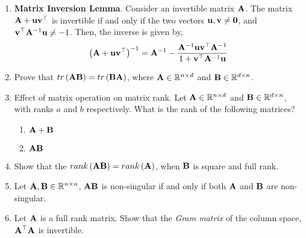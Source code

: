 \documentclass[
11pt, %
a4paper, %
oneside, %
headinclude,footinclude, %
BCOR5mm, %
]{scrartcl}
\def\mf{\ensuremath\mathbf}
\def\mb{\ensuremath\mathbb}
\def\lp{\ensuremath\left(}
\def\rp{\ensuremath\right)}
\begin{document}
\begin{enumerate}
	\item \textbf{Matrix Inversion Lemma}. Consider an invertible matrix $\mf{A}$. The matrix $\mf{A} + \mf{u}\mf{v}^\top$ is invertible if and only if the two vectors $\mf{u}, \mf{v} \neq \mf{0}$, and $\mf{v}^\top\mf{A}^{-1}\mf{u} \neq -1$. Then, the inverse is given by,
	\[ \lp \mf{A} + \mf{u}\mf{v}^\top\rp^{-1} = \mf{A}^{-1} - \frac{\mf{A}^{-1}\mf{u}\mf{v}^\top\mf{A}^{-1}}{1 + \mf{v}^{\top}\mf{A}^{-1}\mf{u}} \]

	\item Prove that $tr\lp \mf{A}\mf{B} \rp = tr\lp \mf{B}\mf{A} \rp$, where $\mf{A} \in \mb{R}^{n \times d}$ and $\mf{B} \in \mb{R}^{d \times n}$.

	\item Effect of matrix operation on matrix rank. Let $\mf{A} \in \mb{R}^{n \times d}$ and $\mf{B} \in \mb{R}^{d \times n}$, with ranks $a$ and $b$ respectively. What is the rank of the following matrices?
		\begin{enumerate}
			\item $\mf{A} + \mf{B}$
			\item $\mf{A}\mf{B}$
		\end{enumerate}

	\item Show that the $rank\pp{\mf{A}\mf{B}} = rank\pp{\mf{A}}$, when $\mf{B}$ is square and full rank.

	\item Let $\mf{A}, \mf{B} \in \mb{R}^{n \times n}$, $\mf{A}\mf{B}$ is non-singular if and only if both $\mf{A}$ and $\mf{B}$ are non-singular.

	\item Let $\mf{A}$ is a full rank matrix. Show that the \textit{Gram matrix} of the column space, $\mf{A}^\top\mf{A}$ is invertible.

\end{enumerate}

\newpage


\end{document}
